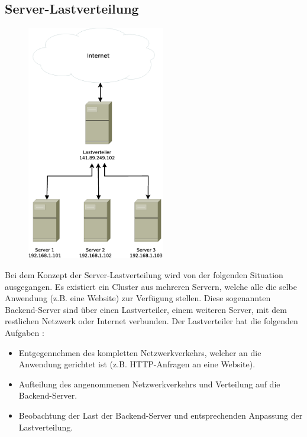 \documentclass[a4paper, 12pt, BCOR10mm, DIV12, toc=bibliography, toc=listof, german]{scrbook}
\begin{document}
			\subsection*{Server-Lastverteilung} %

			\begin{figure}
				\centering
				\includegraphics[width=6cm]{images/loadbalancer}
				\caption{}
				\label{fig:}
			\end{figure}
			

			Bei dem Konzept der Server-Lastverteilung wird von der folgenden Situation ausgegangen.  Es
			existiert ein Cluster aus mehreren Servern, welche alle die selbe Anwendung (z.B. eine Website)
			zur Verfügung stellen. Diese sogenannten Backend-Server sind über einen Lastverteiler, einem weiteren
			Server, mit dem restlichen Netzwerk oder Internet verbunden. Der Lastverteiler hat die
			folgenden Aufgaben \cite{bourke2001}:

			\begin{itemize}
				\item Entgegennehmen des kompletten Netzwerkverkehrs, welcher an die Anwendung gerichtet ist
					(z.B. HTTP-Anfragen an eine Website).
				\item Aufteilung des angenommenen Netzwerkverkehrs und Verteilung auf die Backend-Server.
				\item Beobachtung der Last der Backend-Server und entsprechenden Anpassung der
					Lastverteilung.
			\end{itemize}
\end{document}
